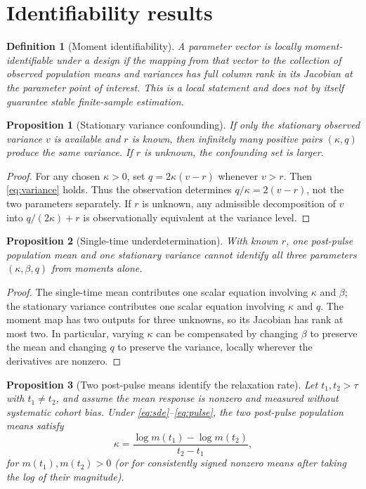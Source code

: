 \documentclass[11pt,a4paper]{article}
\newtheorem{proposition}{Proposition}
\newtheorem{definition}{Definition}
\begin{document}
\section{Identifiability results}
\begin{definition}[Moment identifiability]
A parameter vector is locally moment-identifiable under a design if the mapping from that vector to the collection of observed population means and variances has full column rank in its Jacobian at the parameter point of interest. This is a local statement and does not by itself guarantee stable finite-sample estimation.
\end{definition}
\begin{proposition}[Stationary variance confounding]
If only the stationary observed variance $v$ is available and $r$ is known, then infinitely many positive pairs $(\kappa,q)$ produce the same variance. If $r$ is unknown, the confounding set is larger.
\end{proposition}
\begin{proof}
For any chosen $\kappa>0$, set $q=2\kappa(v-r)$ whenever $v>r$. Then \cref{eq:variance} holds. Thus the observation determines $q/\kappa=2(v-r)$, not the two parameters separately. If $r$ is unknown, any admissible decomposition of $v$ into $q/(2\kappa)+r$ is observationally equivalent at the variance level.
\end{proof}
\begin{proposition}[Single-time underdetermination]
With known $r$, one post-pulse population mean and one stationary variance cannot identify all three parameters $(\kappa,\beta,q)$ from moments alone.
\end{proposition}
\begin{proof}
The single-time mean contributes one scalar equation involving $\kappa$ and $\beta$; the stationary variance contributes one scalar equation involving $\kappa$ and $q$. The moment map has two outputs for three unknowns, so its Jacobian has rank at most two. In particular, varying $\kappa$ can be compensated by changing $\beta$ to preserve the mean and changing $q$ to preserve the variance, locally wherever the derivatives are nonzero.
\end{proof}
\begin{proposition}[Two post-pulse means identify the relaxation rate]
Let $t_1,t_2>\tau$ with $t_1\ne t_2$, and assume the mean response is nonzero and measured without systematic cohort bias. Under \cref{eq:sde}--\cref{eq:pulse}, the two post-pulse population means satisfy
\begin{equation}
\kappa=\frac{\log m(t_1)-\log m(t_2)}{t_2-t_1},
\label{eq:kappa_ratio}
\end{equation}
for $m(t_1),m(t_2)>0$ (or for consistently signed nonzero means after taking the log of their magnitude).
\end{proposition}
\end{document}
